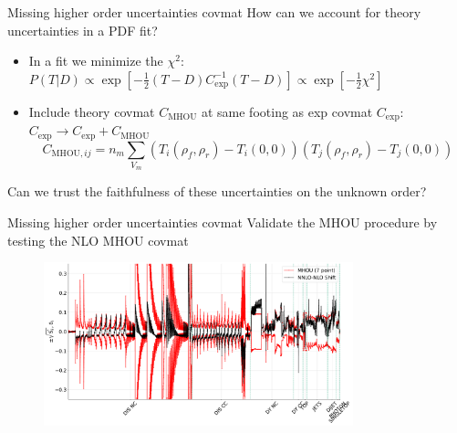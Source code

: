 \documentclass[aspectratio=169, 9pt,t]{beamer}
\begin{document}
\begin{frame}{Missing higher order uncertainties covmat}
  How can we account for theory uncertainties in a PDF fit?

  \vspace*{1em}
  \begin{itemize}
    \item In a fit we minimize the $\chi^2$: \\
    $P(T|D) \propto \exp\left[-\frac{1}{2}\left(T-D\right)C_\mathrm{exp}^{-1}\left(T-D\right)\right] \propto \exp\left[-\frac{1}{2}\chi^2\right]$
    \item Include theory covmat $C_\mathrm{MHOU}$ at same footing as exp covmat $C_\mathrm{exp}$: $C_\mathrm{exp}\rightarrow C_\mathrm{exp}+C_\mathrm{MHOU}$ \\
    $$C_{\mathrm{MHOU},ij} = n_{m}\sum_{V_{m}}\left(T_{i}(\rho_f, \rho_r) - T_{i}(0, 0)\right)\left(T_{j}(\rho_f, \rho_r) - T_{j}(0, 0)\right)$$
  \end{itemize}

  \vspace*{1em}
  \begin{center}
    Can we trust the faithfulness of these uncertainties on the unknown order?
  \end{center}

\end{frame}


\begin{frame}{Missing higher order uncertainties covmat}
  Validate the MHOU procedure by testing the NLO MHOU covmat
  \begin{figure}[!t]
    \centering
      \includegraphics[width=0.8\textwidth]{figures/shift_validation.pdf}
  \end{figure}
\end{frame}
\end{document}
